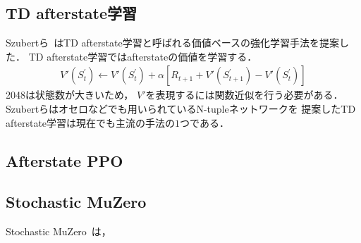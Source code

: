 \subsection{TD afterstate学習}
Szubertら~\cite{Szubert}はTD afterstate学習と呼ばれる価値ベースの強化学習手法を提案した．
TD afterstate学習ではafterstateの価値を学習する．
\begin{align}
  \label{eq:td_afterstate}
  V'(S_{t}^{'}) \leftarrow  V'(S_{t}^{'}) + \alpha [R_{t+1} + V'(S_{t+1}^{'}) - V'(S_{t}^{'})]
\end{align}
2048は状態数が大きいため， $V'$を表現するには関数近似を行う必要がある．
Szubertらはオセロなどでも用いられているN-tupleネットワークを
提案したTD afterstate学習は現在でも主流の手法の$1$つである．


\subsection{Afterstate PPO}

\subsection{Stochastic MuZero}
Stochastic MuZero~\cite{StochasticMuZero}は， 
